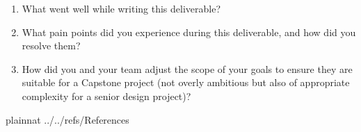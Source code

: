 \documentclass{article}
\begin{document}



\begin{enumerate}
    \item What went well while writing this deliverable? 
    \item What pain points did you experience during this deliverable, and how
    did you resolve them?
    \item How did you and your team adjust the scope of your goals to ensure
    they are suitable for a Capstone project (not overly ambitious but also of
    appropriate complexity for a senior design project)?
\end{enumerate}  

\newpage

 {plainnat}
 {../../refs/References}
\end{document}
